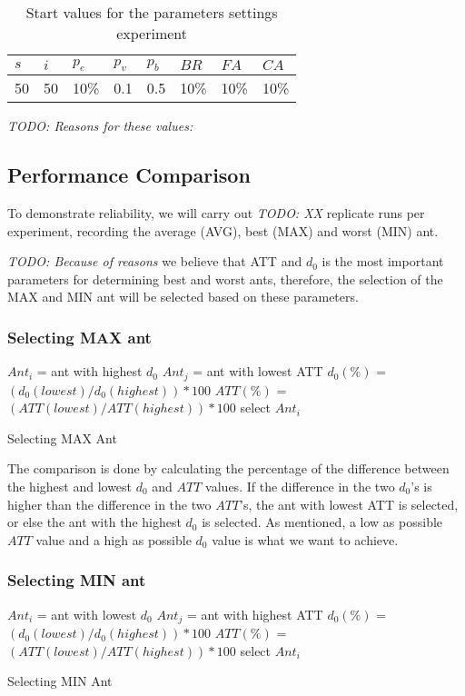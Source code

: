 \begin{table}[H]
	\centering
    \begin{tabular}{|l|l|l|l|l|l|l|l|}
 	\hline
 	$s$ & $i$ & $p_{e}$ & $p_{v}$ & $p_{b}$ & $BR$  & $FA$ & $CA$  \\
 	\hline
    50 & 50 & 10\% & 0.1 & 0.5 & 10\% & 10\%  & 10\%  \\
	\hline
    \end{tabular}
    \caption {Start values for the parameters settings experiment} \emph{\color{blue} TODO: Reasons for these values:}
    \label{table:parameter_startvalues}
	\end{table}

\subsection{Performance Comparison}

To demonstrate reliability, we will carry out \emph{\color{blue} TODO: XX } replicate runs per experiment, recording the average (AVG), best (MAX) and worst (MIN) ant.  

\emph{\color{blue} TODO: Because of reasons }we believe that ATT and $d_0$ is the most important parameters for determining best and worst ants, therefore, the selection of the MAX and MIN ant will be selected based on these parameters. 

\subsubsection{Selecting MAX ant}
\begin{algorithm}[H]
$Ant_{i}$ = ant with highest $d_0$\;
$Ant_{j}$ = ant with lowest ATT\;
{
	$d_0(\%)$ = $(d_0(lowest) / d_0(highest))*100$\;
	$ATT(\%)$ = $(ATT(lowest) / ATT(highest))*100$\;
	{
		select $Ant_{i}$
	}
}
 \caption{Selecting MAX Ant}
\end{algorithm}


The comparison is done by calculating the percentage of the difference between the highest and lowest $d_0$ and $ATT$ values. If the difference in the two $d_0$'s is higher than the difference in the two $ATT$'s, the ant with lowest ATT is selected, or else the ant with the highest $d_0$ is selected. As mentioned, a low as possible $ATT$ value and a high as possible $d_0$ value is what we want to achieve.

\subsubsection{Selecting MIN ant}
\begin{algorithm}[H]
$Ant_{i}$ = ant with lowest $d_0$\;
$Ant_{j}$ = ant with highest ATT\;
{
	$d_0(\%)$ = $(d_0(lowest) / d_0(highest))*100$\;
	$ATT(\%)$ = $(ATT(lowest) / ATT(highest))*100$\;
	{
		select $Ant_{i}$
	}
}
 \caption{Selecting MIN Ant}

\end{algorithm}

